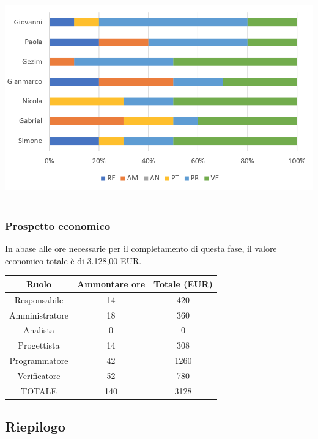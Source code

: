 \includegraphics[width=\textwidth]{res/img/hi5}
\
\subsubsection{Prospetto economico}
In abase alle ore necessarie per il completamento di questa fase, il valore economico totale è di 3.128,00 EUR.
\begin{center}
\begin{tabular}{ |c|c|c|  }
 \hline
 Ruolo 		& Ammontare ore 	& Totale (EUR)\\
 	\hline
 \hline
 	Responsabile	& 14 	& 420\\
	Amministratore	& 18		& 360\\
	Analista		& 0 		& 0\\
	Progettista		& 14		& 308\\
	Programmatore	& 42		& 1260\\
	Verificatore	& 52 	& 780\\
 \hline\hline
 TOTALE		& 140		& 3128\\
  \hline
\end{tabular}
\end{center}

\newpage
\subsection{Riepilogo}
